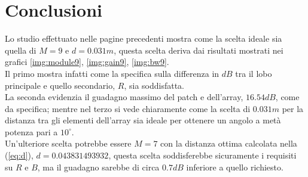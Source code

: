 \section{Conclusioni}
Lo studio effettuato nelle pagine precedenti mostra come la scelta ideale sia quella di $M = 9$ e $d = 0.031 m$, questa scelta deriva dai risultati mostrati nei grafici \ref{img:module9}, \ref{img:gain9}, \ref{img:bw9}. \\
Il primo mostra infatti come la specifica sulla differenza in $dB$ tra il lobo principale e quello secondario, $R$, sia soddisfatta. \\
La seconda evidenzia il guadagno massimo del patch e dell'array, $16.54 dB$, come da specifica; mentre nel terzo si vede chiaramente come la scelta di $0.031 m$ per la distanza tra gli elementi dell'array sia ideale per ottenere un angolo a metà potenza pari a $10^\circ$. \\[1cm]
Un'ulteriore scelta potrebbe essere $M = 7$ con la distanza ottima calcolata nella (\ref{eq:d}), $d = 0.043831493932$, questa scelta soddisferebbe sicuramente i requisiti su $R$ e $B$, ma il guadagno sarebbe di circa $0.7 dB$ inferiore a quello richiesto.